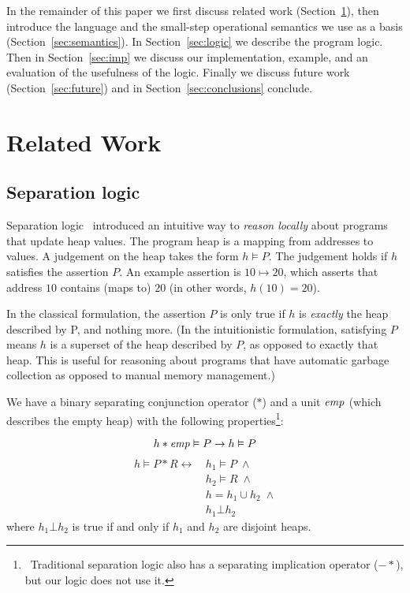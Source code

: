In the remainder of this paper we first discuss related work
(Section~\ref{sec:relwork}), then introduce the language and the
small-step operational semantics we use as a basis (Section~\ref{sec:semantics}).
In Section~\ref{sec:logic} we describe the program logic.
Then in Section~\ref{sec:imp} we discuss our implementation, example, and an
evaluation of the usefulness of the logic.
Finally we discuss future work (Section~\ref{sec:future}) and in
Section~\ref{sec:conclusions} conclude.

\section{Related Work}
\label{sec:relwork}

\subsection{Separation logic}
Separation logic~\cite{reynolds2002separation} introduced an intuitive way to
\textit{reason locally} about programs that update heap values.
The program heap is a
mapping from addresses to values.
A judgement on the heap takes the form
$h \vDash P$.
The judgement holds if $h$ satisfies the assertion $P$.
An
example assertion is $10 \mapsto 20$, which asserts that address $10$ contains
(maps to) $20$ (in other words, $h(10) = 20$).

In the classical formulation,
the
assertion $P$ is only true if $h$ is \textit{exactly} the heap described by P,
and nothing more.
(In the intuitionistic formulation,
satisfying $P$ means $h$ is a superset of the heap described by $P$, as opposed
to exactly that heap.
This is useful for reasoning about programs that have
automatic garbage collection as opposed to manual memory management.)

We have a binary separating conjunction operator ($\ast$) and
a unit $\mathit{emp}$ (which describes the empty heap) with the following
properties\footnote{\
Traditional separation logic also has a separating implication operator
($-\!\!\ast$),
but our logic does not use it.}:

\[
    h \ast \mathit{emp} \vDash P \rightarrow h \vDash P \\
\]
\begin{align*}
    h \vDash P \ast R \leftrightarrow \, &h_1 \vDash P \; \wedge \\
		           &h_2 \vDash R \; \wedge \\
		           &h = h_1 \cup h_2 \; \wedge \\
			   &h_1 \bot h_2
\end{align*}
where $h_1 \bot h_2$ is true if and only if $h_1$ and $h_2$ are
disjoint heaps.


